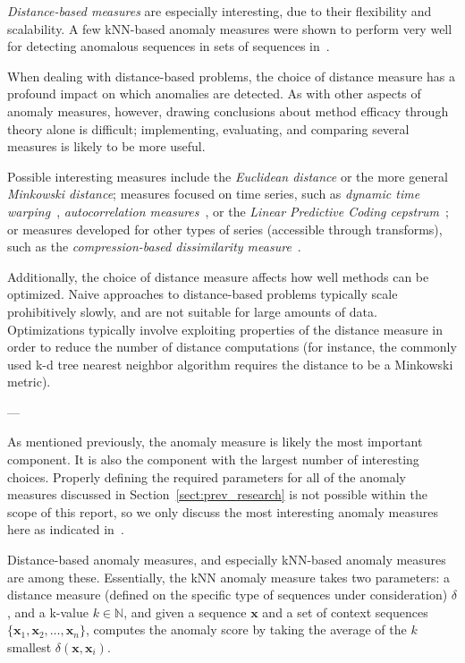 \emph{Distance-based measures} are especially interesting, due to their flexibility and scalability. A few kNN-based anomaly measures were shown to perform very well for detecting anomalous sequences in sets of sequences in~\cite{chandola3}.

When dealing with distance-based problems, the choice of distance measure has a profound impact on which anomalies are detected. As with other aspects of anomaly measures, however, drawing conclusions about method efficacy through theory alone is difficult; implementing, evaluating, and comparing several measures is likely to be more useful.

Possible interesting measures include the \emph{Euclidean distance} or the more general \emph{Minkowski distance}; measures focused on time series, such as \emph{dynamic time warping}~\cite{dtw}, \emph{autocorrelation measures}~\cite{autocorrelation}, or the \emph{Linear Predictive Coding cepstrum}~\cite{cepstrum}; or measures developed for other types of series (accessible through transforms), such as the \emph{compression-based dissimilarity measure}~\cite{keogh2}.

Additionally, the choice of distance measure affects how well methods can be optimized. Naive approaches to distance-based problems typically scale prohibitively slowly, and are not suitable for large amounts of data. Optimizations typically involve exploiting properties of the distance measure in order to reduce the number of distance computations (for instance, the commonly used k-d tree nearest neighbor algorithm requires the distance to be a Minkowski metric).

---

As mentioned previously, the anomaly measure is likely the most important component. It is also the component with the largest number of interesting choices. Properly defining the required parameters for all of the anomaly measures discussed in Section~\ref{sect:prev_research} is not possible within the scope of this report, so we only discuss the most interesting anomaly measures here as indicated in~\cite{chandola3}.

Distance-based anomaly measures, and especially kNN-based anomaly measures are among these. Essentially, the kNN anomaly measure takes two parameters: a distance measure (defined on the specific type of sequences under consideration) $\delta$, and a k-value $k \in \mathbb{N}$, and given a sequence $\mathbf{x}$ and a set of context sequences $\{\mathbf{x}_1, \mathbf{x}_2, \dots, \mathbf{x}_n\}$, computes the anomaly score by taking the average of the $k$ smallest $\delta(\mathbf{x}, \mathbf{x}_i)$.

